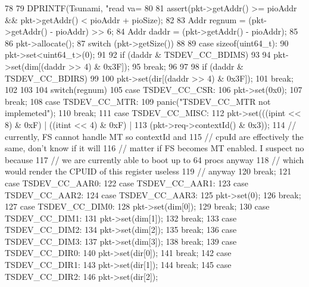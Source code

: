 \begin{DoxyCode}
78 {
79     DPRINTF(Tsunami, "read  va=%
80 
81     assert(pkt->getAddr() >= pioAddr && pkt->getAddr() < pioAddr + pioSize);
82 
83     Addr regnum = (pkt->getAddr() - pioAddr) >> 6;
84     Addr daddr = (pkt->getAddr() - pioAddr);
85 
86     pkt->allocate();
87     switch (pkt->getSize()) {
88 
89       case sizeof(uint64_t):
90           pkt->set<uint64_t>(0);
91 
92           if (daddr & TSDEV_CC_BDIMS)
93           {
94               pkt->set(dim[(daddr >> 4) & 0x3F]);
95               break;
96           }
97 
98           if (daddr & TSDEV_CC_BDIRS)
99           {
100               pkt->set(dir[(daddr >> 4) & 0x3F]);
101               break;
102           }
103 
104           switch(regnum) {
105               case TSDEV_CC_CSR:
106                   pkt->set(0x0);
107                   break;
108               case TSDEV_CC_MTR:
109                   panic("TSDEV_CC_MTR not implemeted\n");
110                    break;
111               case TSDEV_CC_MISC:
112                   pkt->set(((ipint << 8) & 0xF) | ((itint << 4) & 0xF) |
113                                      (pkt->req->contextId() & 0x3));
114                   // currently, FS cannot handle MT so contextId and
115                   // cpuId are effectively the same, don't know if it will
116                   // matter if FS becomes MT enabled.  I suspect no because
117                   // we are currently able to boot up to 64 procs anyway
118                   // which would render the CPUID of this register useless
119                   // anyway
120                   break;
121               case TSDEV_CC_AAR0:
122               case TSDEV_CC_AAR1:
123               case TSDEV_CC_AAR2:
124               case TSDEV_CC_AAR3:
125                   pkt->set(0);
126                   break;
127               case TSDEV_CC_DIM0:
128                   pkt->set(dim[0]);
129                   break;
130               case TSDEV_CC_DIM1:
131                   pkt->set(dim[1]);
132                   break;
133               case TSDEV_CC_DIM2:
134                   pkt->set(dim[2]);
135                   break;
136               case TSDEV_CC_DIM3:
137                   pkt->set(dim[3]);
138                   break;
139               case TSDEV_CC_DIR0:
140                   pkt->set(dir[0]);
141                   break;
142               case TSDEV_CC_DIR1:
143                   pkt->set(dir[1]);
144                   break;
145               case TSDEV_CC_DIR2:
146                   pkt->set(dir[2]);
}}}
\end{DoxyCode}
